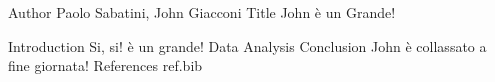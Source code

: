 Author Paolo Sabatini, John Giacconi 
Title	John è un Grande!
	
Introduction	Si, si! è un grande!
Data
Analysis
Conclusion John è collassato a fine giornata!
References ref.bib

